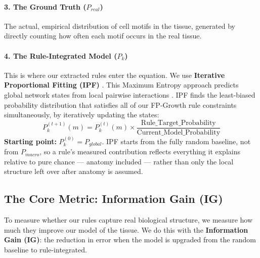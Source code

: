 \documentclass[10pt, a4paper]{article}
\begin{document}
\paragraph{3. The Ground Truth ($P_{real}$)}
The actual, empirical distribution of cell motifs in the tissue, generated by directly counting how often each motif occurs in the real tissue.

\paragraph{4. The Rule-Integrated Model ($P_k$)}
This is where our extracted rules enter the equation. We use \textbf{Iterative Proportional Fitting (IPF)} \cite{Deming1940}. This Maximum Entropy approach predicts global network states from local pairwise interactions \cite{Schneidman2006}. IPF finds the least-biased probability distribution that satisfies all of our FP-Growth rule constraints simultaneously, by iteratively updating the states:
\begin{equation}
P_k^{(t+1)}(m) = P_k^{(t)}(m) \times \frac{\text{Rule\_Target\_Probability}}{\text{Current\_Model\_Probability}}
\end{equation}
\textbf{Starting point:} $P_k^{(0)} = P_{global}$. IPF starts from the fully random baseline, not from $P_{macro}$, so a rule's measured contribution reflects everything it explains relative to pure chance --- anatomy included --- rather than only the local structure left over after anatomy is assumed.


\subsection{The Core Metric: Information Gain (IG)}
\label{sec:ig-metric}
To measure whether our rules capture real biological structure, we measure how much they improve our model of the tissue. We do this with the \textbf{Information Gain (IG)}: the reduction in error when the model is upgraded from the random baseline to rule-integrated.
\end{document}

